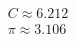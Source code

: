 \documentclass[preview]{standalone}
\begin{document}
\begin{align*}
C \approx 6.212 \\\pi \approx 3.106
\end{align*}
\end{document}
